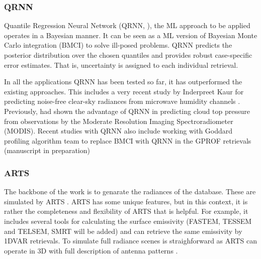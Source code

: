 \documentclass[12pt,oneside,a4paper]{article}
\begin{document}
\subsubsection{QRNN}
%
\label{sec:qrnn}

Quantile Regression Neural Network (QRNN, \citet{pfreundschuh:aneur:18}), the
ML approach to be applied operates in a Bayesian manner. It can be seen as a ML
version of Bayesian Monte Carlo integration (BMCI) to solve ill-posed problems.
QRNN predicts the posterior distribution over the chosen quantiles and provides
robust case-specific error estimates. That is, uncertainty is assigned to each
individual retrieval. 


In all the applications QRNN has been tested so far, it has outperformed the
existing approaches. This includes a very recent study by Inderpreet Kaur for
predicting noise-free clear-sky radiances from microwave humidity channels
\citep{kaur:2021:canma}. Previously, \citet{pfreundschuh:aneur:18} had shown
the advantage of QRNN in predicting cloud top pressure from observations by the
Moderate Resolution Imaging Spectroradiometer (MODIS). Recent studies with QRNN
also include working with Goddard profiling algorithm \citep[GPROF,][] {kummerow:2015:thevo} team to replace
BMCI with QRNN in the GPROF retrievals (manuscript in
preparation)


\subsubsection{ARTS}
\label{sec:arts}
% 
The backbone of the work is to genarate the radiances of the database. These
are simulated by ARTS \citep[Atmospheric Radiative Transfer Simulator,][]
{eriksson:arts2:11}. ARTS has some unique features, but in this context,
it is rather the completeness and flexibility of ARTS that is helpful. For
example, it includes several tools for calculating the surface emissivity
(FASTEM, TESSEM and TELSEM, SMRT will be added) and can retrieve the same
emissivity by 1DVAR retrievals. To simulate full radiance scenes is
straighforward as ARTS can operate in 3D with full description of antenna
patterns \citep{duncan:anexp:19}.
\end{document}
